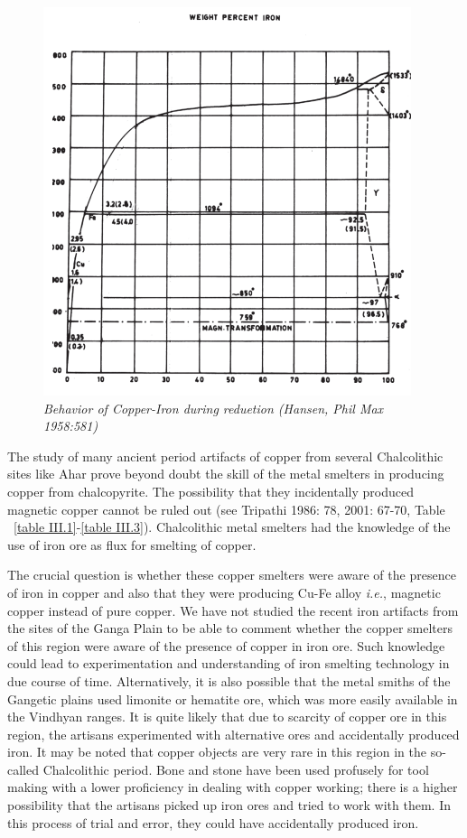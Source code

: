 \begin{figure}[H]
\includegraphics[scale=.7]{images/chapter-3/fig001.jpg}
\caption*{\textit{Behavior of Copper-Iron during reduetion (Hansen, Phil Max 1958:581)}}\label{chapter2-fig001}
\end{figure}

\vspace{-.4cm}

The study of many ancient period artifacts of copper from several Chalcolithic sites like Ahar prove beyond doubt the skill of the metal smelters in producing copper from chalcopyrite. The possibility that they incidentally produced magnetic copper cannot be ruled out (see Tripathi 1986: 78, 2001: 67-70, Table ~\ref{table III.1}-\ref{table III.3}). Chalcolithic metal smelters had the knowledge of the use of iron ore as flux for smelting of copper. 

The crucial question is whether these copper smelters were aware of the presence of iron in copper and also that they were producing Cu-Fe alloy \textit{i.e.}, magnetic copper instead of pure copper. We have not studied the recent iron artifacts from the sites of the Ganga Plain to be able to comment whether the copper smelters of this region were aware of the presence of copper in iron ore. Such knowledge could lead to experimentation and understanding of iron smelting technology in due course of time. Alternatively, it is also possible that the metal smiths of the Gangetic plains used limonite or hematite ore, which was more easily available in the Vindhyan ranges. It is quite likely that due to scarcity of copper ore in this region, the artisans experimented with alternative ores and accidentally produced iron. It may be noted that copper objects are very rare in this region in the so-called Chalcolithic period. Bone and stone have been used profusely for tool making with a lower proficiency in dealing with copper working; there is a higher possibility that the artisans picked up iron ores and tried to work with them. In this process of trial and error, they could have accidentally produced iron.

